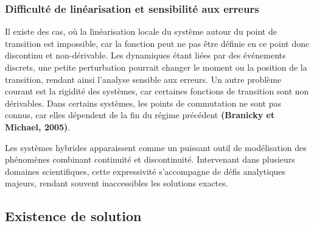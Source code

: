 \documentclass[12pt, oneside]{report} %
\theoremstyle{definition}
\newtheorem{exam}{\textbf{Exemple}}[section]
\theoremstyle{remark}
\begin{document}
	
	\subsubsection{Difficulté de linéarisation et sensibilité aux erreurs}
	
Il existe des cas, où la linéarisation locale du système autour du point de transition est impossible, car la fonction peut ne pas être définie en ce point donc discontinu et non-dérivable. Les dynamiques étant liées par des événements discrets, une petite perturbation pourrait changer le moment ou la position de la transition, rendant ainsi l'analyse sensible aux erreurs. Un autre problème courant est la rigidité des systèmes, car certaines fonctions de transition sont non dérivables. Dans certains systèmes, les points de commutation ne sont pas connus, car elles dépendent de la fin du régime précédent \textbf{\textbf{(Branicky et Michael}, 2005)}. %

Les systèmes hybrides apparaissent comme un puissant outil de modélisation des phénomènes combinant continuité et discontinuité. Intervenant dans plusieurs domaines scientifiques, cette expressivité s'accompagne de défis analytiques majeurs, rendant souvent inaccessibles les solutions exactes.
	
		\subsection{Existence de solution}	
\end{document}
